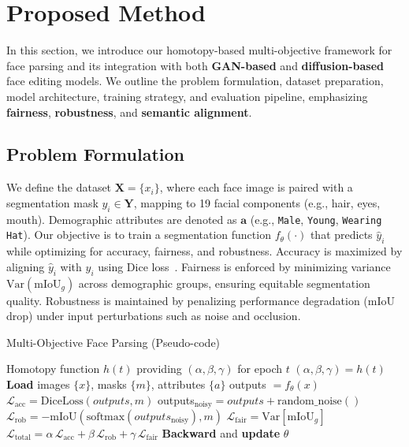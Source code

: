 \section{Proposed Method}
\label{sec:method}

In this section, we introduce our homotopy-based multi-objective framework for face parsing and its integration with both \textbf{GAN-based} and \textbf{diffusion-based} face editing models. We outline the problem formulation, dataset preparation, model architecture, training strategy, and evaluation pipeline, emphasizing \textbf{fairness}, \textbf{robustness}, and \textbf{semantic alignment}.

\subsection{Problem Formulation}
\label{subsec:problem_formulation}

We define the dataset \(\mathbf{X} = \{x_i\}\), where each face image is paired with a segmentation mask \( y_i \in \mathbf{Y} \), mapping to 19 facial components (e.g., hair, eyes, mouth). Demographic attributes are denoted as \(\mathbf{a}\) (e.g., \texttt{Male}, \texttt{Young}, \texttt{Wearing Hat}). Our objective is to train a segmentation function \( f_\theta(\cdot) \) that predicts \(\hat{y}_i\) while optimizing for accuracy, fairness, and robustness. Accuracy is maximized by aligning \(\hat{y}_i\) with \(y_i\) using Dice loss~\cite{sudre2017generalised}. Fairness is enforced by minimizing variance \(\mathrm{Var}(\mathrm{mIoU}_g)\) across demographic groups, ensuring equitable segmentation quality. Robustness is maintained by penalizing performance degradation (\(\mathrm{mIoU}\) drop) under input perturbations such as noise and occlusion.

\begin{algorithm}[h][t]
\caption{Multi-Objective Face Parsing (Pseudo-code)}
\label{alg:multi_objective_pseudocode}
\begin{algorithmic}[1]
\Require Homotopy function \(h(t)\) providing \((\alpha, \beta, \gamma)\) for epoch \(t\)
    \State \((\alpha, \beta, \gamma) = h(t)\)
        \State \textbf{Load} images \(\{x\}\), masks \(\{m\}\), attributes \(\{a\}\)
        \State outputs \(= f_{\theta}(x)\) 
        \State \(\mathcal{L}_{\mathrm{acc}} = \mathrm{DiceLoss}(outputs, m)\)
        \State outputs\(_{\mathrm{noisy}} = outputs + \text{random\_noise}()\)
        \State \(\mathcal{L}_{\mathrm{rob}} = -\mathrm{mIoU}(\mathrm{softmax}(outputs_{\mathrm{noisy}}), m)\)
        \State \(\mathcal{L}_{\mathrm{fair}} = \mathrm{Var}\left[\mathrm{mIoU}_g\right]\)
        \State \(\mathcal{L}_{\text{total}} = \alpha\,\mathcal{L}_{\mathrm{acc}} + \beta\,\mathcal{L}_{\mathrm{rob}} + \gamma\,\mathcal{L}_{\mathrm{fair}}\)
        \State \textbf{Backward} and \textbf{update} \(\theta\)
    \EndFor
\EndFor
\end{algorithmic}
\end{algorithm}

